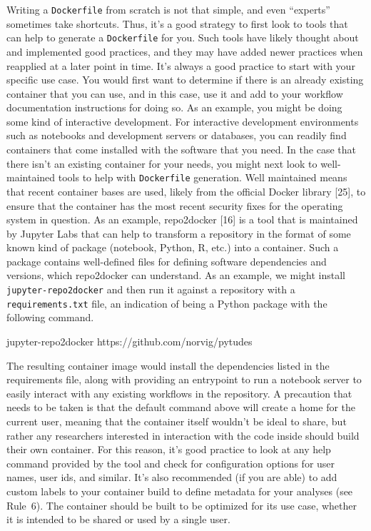 \documentclass[10pt,letterpaper]{article}
\newenvironment{Shaded}{\begin{snugshade}}{\end{snugshade}}
\newcommand{\ExtensionTok}[1]{#1}
\newcommand{\NormalTok}[1]{#1}
\begin{document}
Writing a \texttt{Dockerfile} from scratch is not that simple, and even
``experts'' sometimes take shortcuts. Thus, it's a good strategy to
first look to tools that can help to generate a \texttt{Dockerfile} for
you. Such tools have likely thought about and implemented good
practices, and they may have added newer practices when reapplied at a
later point in time. It's always a good practice to start with your
specific use case. You would first want to determine if there is an
already existing container that you can use, and in this case, use it
and add to your workflow documentation instructions for doing so. As an
example, you might be doing some kind of interactive development. For
interactive development environments such as notebooks and development
servers or databases, you can readily find containers that come
installed with the software that you need. In the case that there isn't
an existing container for your needs, you might next look to
well-maintained tools to help with \texttt{Dockerfile} generation. Well
maintained means that recent container bases are used, likely from the
official Docker library {[}25{]}, to ensure that the container has the
most recent security fixes for the operating system in question. As an
example, repo2docker {[}16{]} is a tool that is maintained by Jupyter
Labs that can help to transform a repository in the format of some known
kind of package (notebook, Python, R, etc.) into a container. Such a
package contains well-defined files for defining software dependencies
and versions, which repo2docker can understand. As an example, we might
install \texttt{jupyter-repo2docker} and then run it against a
repository with a \texttt{requirements.txt} file, an indication of being
a Python package with the following command.

\begin{Shaded}
\begin{Highlighting}[]
\ExtensionTok{jupyter-repo2docker}\NormalTok{ https://github.com/norvig/pytudes}
\end{Highlighting}
\end{Shaded}

The resulting container image would install the dependencies listed in
the requirements file, along with providing an entrypoint to run a
notebook server to easily interact with any existing workflows in the
repository. A precaution that needs to be taken is that the default
command above will create a home for the current user, meaning that the
container itself wouldn't be ideal to share, but rather any researchers
interested in interaction with the code inside should build their own
container. For this reason, it's good practice to look at any help
command provided by the tool and check for configuration options for
user names, user ids, and similar. It's also recommended (if you are
able) to add custom labels to your container build to define metadata
for your analyses (see Rule~6). The container should be built to be
optimized for its use case, whether it is intended to be shared or used
by a single user.
\end{document}
